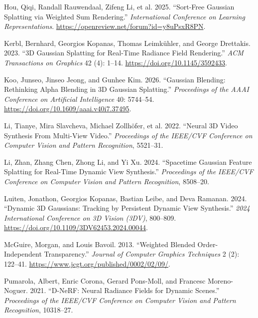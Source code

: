 \documentclass[
]{article}
\newlength{\cslhangindent}
\newenvironment{CSLReferences}[2] %
 {\begin{list}{}{%
  \setlength{\itemindent}{0pt}
  \setlength{\leftmargin}{0pt}
  \setlength{\parsep}{0pt}
  \ifodd #1
   \setlength{\leftmargin}{\cslhangindent}
   \setlength{\itemindent}{-1\cslhangindent}
  \fi
  \setlength{\itemsep}{#2\baselineskip}}}
 {\end{list}}
\begin{document}
\protect{}\label{refs}
\begin{CSLReferences}{1}{1}
Hou, Qiqi, Randall Rauwendaal, Zifeng Li, et al. 2025. {``{Sort-Free
Gaussian Splatting via Weighted Sum Rendering}.''} \emph{International
Conference on Learning Representations}.
\url{https://openreview.net/forum?id=y8uPsxR8PN}.

Kerbl, Bernhard, Georgios Kopanas, Thomas Leimkühler, and George
Drettakis. 2023. {``{3D Gaussian Splatting for Real-Time Radiance Field
Rendering}.''} \emph{ACM Transactions on Graphics} 42 (4): 1--14.
\url{https://doi.org/10.1145/3592433}.

Koo, Junseo, Jinseo Jeong, and Gunhee Kim. 2026. {``{Gaussian Blending:
Rethinking Alpha Blending in 3D Gaussian Splatting}.''}
\emph{Proceedings of the AAAI Conference on Artificial Intelligence} 40:
5744--54. \url{https://doi.org/10.1609/aaai.v40i7.37495}.

Li, Tianye, Mira Slavcheva, Michael Zollhöfer, et al. 2022. {``{Neural
3D Video Synthesis From Multi-View Video}.''} \emph{Proceedings of the
IEEE/CVF Conference on Computer Vision and Pattern Recognition},
5521--31.

Li, Zhan, Zhang Chen, Zhong Li, and Yi Xu. 2024. {``{Spacetime Gaussian
Feature Splatting for Real-Time Dynamic View Synthesis}.''}
\emph{Proceedings of the IEEE/CVF Conference on Computer Vision and
Pattern Recognition}, 8508--20.

Luiten, Jonathon, Georgios Kopanas, Bastian Leibe, and Deva Ramanan.
2024. {``{Dynamic 3D Gaussians: Tracking by Persistent Dynamic View
Synthesis}.''} \emph{2024 International Conference on 3D Vision (3DV)},
800--809. \url{https://doi.org/10.1109/3DV62453.2024.00044}.

McGuire, Morgan, and Louis Bavoil. 2013. {``{Weighted Blended
Order-Independent Transparency}.''} \emph{Journal of Computer Graphics
Techniques} 2 (2): 122--41.
\url{https://www.jcgt.org/published/0002/02/09/}.

Pumarola, Albert, Enric Corona, Gerard Pons-Moll, and Francesc
Moreno-Noguer. 2021. {``{D-NeRF: Neural Radiance Fields for Dynamic
Scenes}.''} \emph{Proceedings of the IEEE/CVF Conference on Computer
Vision and Pattern Recognition}, 10318--27.


\end{CSLReferences}
\end{document}
